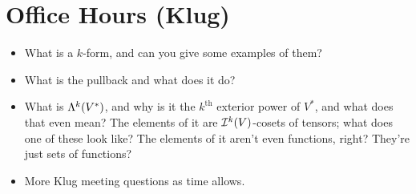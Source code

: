 \documentclass[../notes.tex]{subfiles}
\begin{document}
\section{Office Hours (Klug)}
\begin{itemize}
    \item What is a $k$-form, and can you give some examples of them?
    \item What is the pullback and what does it do?
    \item What is $\lam[k]{V^*}$, and why is it the $k^\text{th}$ exterior power of $V^*$, and what does that even mean? The elements of it are $\ide[k]{V}$-cosets of tensors; what does one of these look like? The elements of it aren't even functions, right? They're just sets of functions?
    \item More Klug meeting questions as time allows.
\end{itemize}
\end{document}
